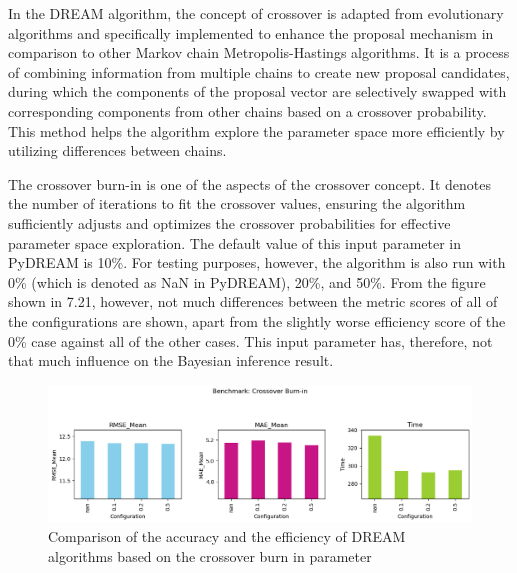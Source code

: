In the DREAM algorithm, the concept of crossover is adapted from evolutionary algorithms and specifically implemented to enhance the proposal mechanism in comparison to other Markov chain Metropolis-Hastings algorithms. It is a process of combining information from multiple chains to create new proposal candidates, during which the components of the proposal vector are selectively swapped with corresponding components from other chains based on a crossover probability.\cite{dream} This method helps the algorithm explore the parameter space more efficiently by utilizing differences between chains.

The crossover burn-in is one of the aspects of the crossover concept. It denotes the number of iterations to fit the crossover values, ensuring the algorithm sufficiently adjusts and optimizes the crossover probabilities for effective parameter space exploration. The default value of this input parameter in PyDREAM is 10\%. For testing purposes, however, the algorithm is also run with 0\% (which is denoted as NaN in PyDREAM), 20\%, and 50\%. From the figure shown in 7.21, however, not much differences between the metric scores of all of the configurations are shown, apart from the slightly worse efficiency score of the 0\% case against all of the other cases. This input parameter has, therefore, not that much influence on the Bayesian inference result.
\begin{figure}[H]
    \centering
    \includegraphics[width=1\textwidth]{figures/dream/crossover_burn_in.png}
    \captionsetup{width=.8\textwidth}
    \caption{Comparison of the accuracy and the efficiency of DREAM algorithms based on the crossover burn in parameter}
    \label{fig:enter-label}
\end{figure}


